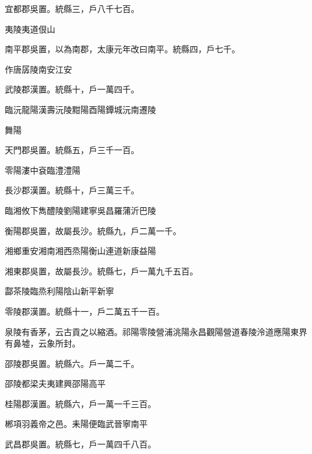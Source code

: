 \begin{pinyinscope}
 宜都郡吳置。統縣三，戶八千七百。



 夷陵夷道佷山



 南平郡吳置，以為南郡，太康元年改曰南平。統縣四，戶七千。



 作唐孱陵南安江安



 武陵郡漢置。統縣十，戶一萬四千。



 臨沅龍陽漢壽沅陵黚陽酉陽鐔城沅南遷陵



 舞陽



 天門郡吳置。統縣五，戶三千一百。



 零陽漊中袞臨澧澧陽



 長沙郡漢置。統縣十，戶三萬三千。



 臨湘攸下雋醴陵劉陽建寧吳昌羅蒲沂巴陵



 衡陽郡吳置，故屬長沙。統縣九，戶二萬一千。



 湘鄉重安湘南湘西烝陽衡山連道新康益陽



 湘東郡吳置，故屬長沙。統縣七，戶一萬九千五百。



 酃茶陵臨烝利陽陰山新平新寧



 零陵郡漢置。統縣十一，戶二萬五千一百。



 泉陵有香茅，云古貢之以縮酒。祁陽零陵營浦洮陽永昌觀陽營道春陵泠道應陽東界有鼻墟，云象所封。



 邵陵郡吳置。統縣六。戶一萬二千。



 邵陵都梁夫夷建興邵陽高平



 桂陽郡漢置。統縣六，戶一萬一千三百。



 郴項羽義帝之邑。耒陽便臨武晉寧南平



 武昌郡吳置。統縣七，戶一萬四千八百。




\end{pinyinscope}
